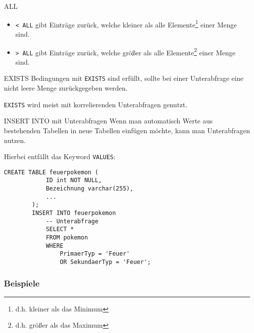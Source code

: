 \begin{sql}{ALL}
    \begin{itemize}
        \item \texttt{< ALL} gibt Einträge zurück, welche kleiner als alle Elemente\footnote{d.h. kleiner als das Minimum} einer Menge sind.
        \item \texttt{> ALL} gibt Einträge zurück, welche größer als alle Elemente\footnote{d.h. größer als das Maximum} einer Menge sind.
    \end{itemize}
\end{sql}

\begin{sql}{EXISTS}
    Bedingungen mit \texttt{EXISTS} sind erfüllt, sollte bei einer Unterabfrage eine nicht leere Menge zurückgegeben werden.

    \texttt{EXISTS} wird meist mit korrelierenden Unterabfragen genutzt.
\end{sql}

\begin{sqlbonus}{INSERT INTO mit Unterabfragen}
    Wenn man automatisch Werte aus bestehenden Tabellen in neue Tabellen einfügen möchte, kann man Unterabfragen nutzen.

    Hierbei entfällt das Keyword \texttt{VALUES}:

    \begin{lstlisting}[language=mysql]
        CREATE TABLE feuerpokemon (
            ID int NOT NULL,
            Bezeichnung varchar(255),
            ...
        );
        INSERT INTO feuerpokemon
            -- Unterabfrage
            SELECT *
            FROM pokemon
            WHERE
                PrimaerTyp = 'Feuer'
                OR SekundaerTyp = 'Feuer';
    \end{lstlisting}
\end{sqlbonus}

\subsubsection{Beispiele}

